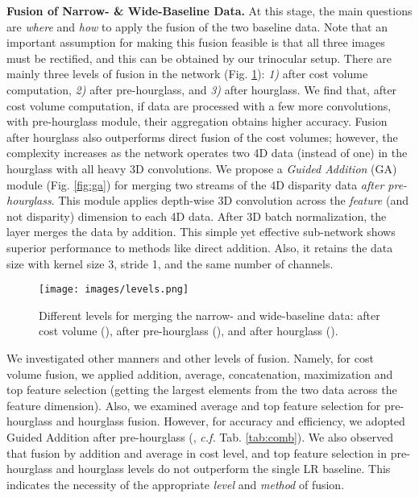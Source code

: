 \documentclass[10pt,twocolumn,letterpaper]{article}
\begin{document}
\noindent\textbf{Fusion of Narrow- \& Wide-Baseline Data.} At this stage, the main questions are \emph{where} and \emph{how} to apply the fusion of the two baseline data. Note that an important assumption for making this fusion feasible is that all three images must be rectified, and this can be obtained by our trinocular setup. There are mainly three levels of fusion in the network (Fig. \ref{fig:levels}): \emph{1)} after cost volume computation, \emph{2)} after pre-hourglass, and \emph{3)} after hourglass. We find that, after cost volume computation, if data are processed with a few more convolutions, \ie with pre-hourglass module, their aggregation obtains higher accuracy. Fusion after hourglass also outperforms direct fusion of the cost volumes; however, the complexity increases as the network operates two 4D data (instead of one) in the hourglass with all heavy 3D convolutions. We propose a \emph{Guided Addition} (GA) module (Fig. \ref{fig:ga}) for merging two streams of the 4D disparity data \emph{after pre-hourglass}. This module applies depth-wise 3D convolution across the \emph{feature} (and not disparity) dimension to each 4D data. After 3D batch normalization, the layer merges the data by addition. This simple yet effective sub-network shows superior performance to methods like direct addition. Also, it retains the data size with kernel size 3, stride 1, and the same number of channels.
\begin{figure}[t]
	\begin{center}
		\texttt{[image: images/levels.png]}
	\end{center}
	\vspace{-0.7cm}
	\caption{Different levels for merging the narrow- and wide-baseline data: after cost volume (), after pre-hourglass (), and after hourglass ().}
	\label{fig:levels}
\end{figure} 
We investigated other manners and other levels of fusion. Namely, for cost volume fusion, we applied addition, average, concatenation, maximization and top feature selection (\ie getting the largest elements from the two data across the feature dimension). Also, we examined average and top feature selection for pre-hourglass and hourglass fusion. However, for accuracy and efficiency, we adopted Guided Addition after pre-hourglass (, \emph{c.f.} Tab. \ref{tab:comb}). We also observed that fusion by addition and average in cost level, and top feature selection in pre-hourglass and hourglass levels do not outperform the single LR baseline. This indicates the necessity of the appropriate \emph{level} and \emph{method} of fusion.
\end{document}
